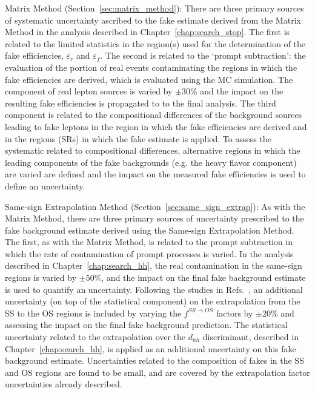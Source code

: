 \begin{description}
    \item{Matrix Method (Section~\ref{sec:matrix_method}):} There are three primary sources of systematic
        uncertainty ascribed to the fake estimate derived from the Matrix Method in the analysis described
        in Chapter~\ref{chap:search_stop}.
        The first is related to the limited statistics in the region(s) used for the determination of the
        fake efficiencies, $\varepsilon_r$ and $\varepsilon_f$.
        The second is related to the `prompt subtraction': the evaluation of the portion of real events contaminating the
        regions in which the fake efficiencies are derived, which is evaluated using the MC simulation.       
        The component of real lepton sources is varied by $\pm 30$\% and the impact on the resulting
        fake efficiencies is propagated to to the final analysis. 
        The third component is related to the compositional differences of the background sources leading
        to fake leptons in the region in which the fake efficiencies are derived and in the regions (SRs)
        in which the fake estimate is applied.
        To assess the systematic related to compositional differences, alternative regions in which the leading
        components of the fake backgrounds (e.g. the heavy flavor component) are varied are defined and the impact on the measured fake efficiencies
        is used to define an uncertainty.
    \item{Same-sign Extrapolation Method (Section~\ref{sec:same_sign_extrap}):} As with the Matrix Method,
        there are three primary sources of uncertainty prescribed to the fake background estimate derived using
        the Same-sign Extrapolation Method. The first, as with the Matrix Method, is related to the prompt subtraction
        in which the rate of contamination of prompt processes is varied.
        In the analysis described in Chapter~\ref{chap:search_hh}, the real contamination in the same-sign
        regions is varied by $\pm 50$\%, and the impact on the final fake background estimate is used to quantify
        an uncertainty.
        Following the studies in Refs.~\cite{TOPQ-2015-09,TOPQ-2017-05}, an additional uncertainty (on top of the statistical component) on the
        extrapolation from the SS to the OS regions is included by varying the $f^{SS \rightarrow OS}$ factors
        by $\pm 20$\% and assessing the impact on the final fake background prediction.
        The statistical uncertainty related to the extrapolation over the $d_{hh}$ discriminant,
        described in Chapter~\ref{chap:search_hh}, is applied as an additional uncertainty on this fake background estimate.
        Uncertainties related to the composition of fakes in the SS and OS regions are found to be small,
        and are covered by the extrapolation factor uncertainties already described.
\end{description}



